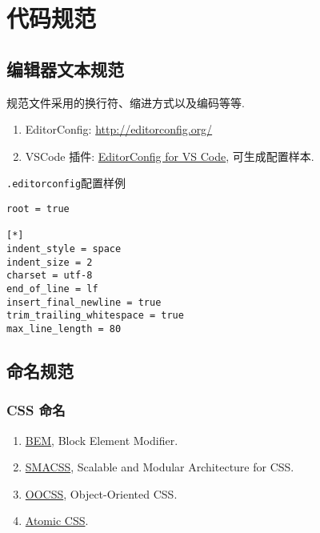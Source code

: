 \section{代码规范}\label{ux4ee3ux7801ux89c4ux8303}

\subsection{编辑器文本规范}\label{ux7f16ux8f91ux5668ux6587ux672cux89c4ux8303}

规范文件采用的换行符、缩进方式以及编码等等.

\begin{enumerate}
\def\labelenumi{\arabic{enumi}.}
\tightlist
\item
  EditorConfig: \url{http://editorconfig.org/}
\item
  VSCode 插件:
  \href{https://marketplace.visualstudio.com/items?itemName=EditorConfig.EditorConfig}{EditorConfig
  for VS Code}, 可生成配置样本.
\end{enumerate}

\lstinline!.editorconfig!配置样例

\begin{lstlisting}
root = true

[*]
indent_style = space
indent_size = 2
charset = utf-8
end_of_line = lf
insert_final_newline = true
trim_trailing_whitespace = true
max_line_length = 80
\end{lstlisting}

\subsection{命名规范}\label{ux547dux540dux89c4ux8303}

\subsubsection{CSS 命名}\label{css-ux547dux540d}

\begin{enumerate}
\def\labelenumi{\arabic{enumi}.}
\tightlist
\item
  \href{http://getbem.com/}{BEM}, Block Element Modifier.
\item
  \href{https://smacss.com/}{SMACSS}, Scalable and Modular Architecture
  for CSS.
\item
  \href{http://oocss.org/}{OOCSS}, Object-Oriented CSS.
\item
  \href{https://acss.io/}{Atomic CSS}.
\end{enumerate}

